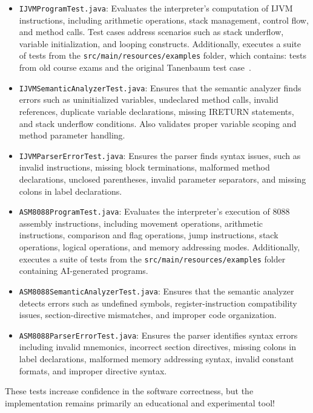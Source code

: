 \documentclass[11pt]{article}
\begin{document}
\begin{itemize} 
	\item \texttt{IJVMProgramTest.java}: Evaluates the interpreter's computation of IJVM instructions, including arithmetic operations, stack management, control flow, and method calls. Test cases address scenarios such as stack underflow, variable initialization, and looping constructs. Additionally, executes a suite of tests from the \texttt{src/main/resources/examples} folder, which contains: tests from old course exams and the original Tanenbaum test case~\cite{ijvmtest}.
	\item \texttt{IJVMSemanticAnalyzerTest.java}: Ensures that the semantic analyzer finds errors such as uninitialized variables, undeclared method calls, invalid references, duplicate variable declarations, missing IRETURN statements, and stack underflow conditions. Also validates proper variable scoping and method parameter handling.
	\item \texttt{IJVMParserErrorTest.java}: Ensures the parser finds syntax issues, such as invalid instructions, missing block terminations, malformed method declarations, unclosed parentheses, invalid parameter separators, and missing colons in label declarations.
	\item \texttt{ASM8088ProgramTest.java}: Evaluates the interpreter's execution of 8088 assembly instructions, including movement operations, arithmetic instructions, comparison and flag operations, jump instructions, stack operations, logical operations, and memory addressing modes. Additionally, executes a suite of tests from the \texttt{src/main/resources/examples} folder containing AI-generated programs.
	\item \texttt{ASM8088SemanticAnalyzerTest.java}: Ensures that the semantic analyzer detects errors such as undefined symbols, register-instruction compatibility issues, section-directive mismatches, and improper code organization.
	\item \texttt{ASM8088ParserErrorTest.java}: Ensures the parser identifies syntax errors including invalid mnemonics, incorrect section directives, missing colons in label declarations, malformed memory addressing syntax, invalid constant formats, and improper directive syntax.
\end{itemize}

These tests increase confidence in the software correctness, but the implementation remains primarily an educational and experimental tool!

\newpage
\end{document}
